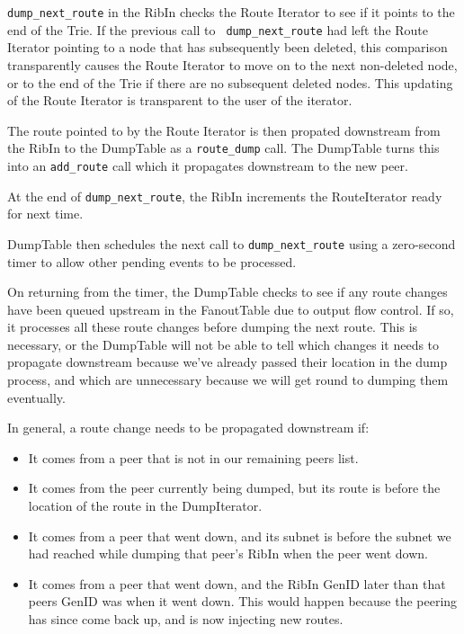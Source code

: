\documentclass[11pt]{article}
\begin{document}
{\tt dump\_next\_route} in the RibIn checks the Route Iterator to see
if it points to the end of the Trie.  If the previous call to {\tt
dump\_next\_route} had left the Route Iterator pointing to a node that has
subsequently been deleted, this comparison transparently causes the
Route Iterator to move on to the next non-deleted node, or to the end
of the Trie if there are no subsequent deleted nodes.  This updating
of the Route Iterator is transparent to the user of the iterator.

The route pointed to by the Route Iterator is then propated downstream
from the RibIn to the DumpTable as a {\tt route\_dump} call.  The
DumpTable turns this into an {\tt add\_route} call which it propagates
downstream to the new peer.

At the end of {\tt dump\_next\_route}, the RibIn increments the
RouteIterator ready for next time.  

DumpTable then schedules the next call to {\tt dump\_next\_route} using a
zero-second timer to allow other pending events to be processed.

On returning from the timer, the DumpTable checks to see if any route
changes have been queued upstream in the FanoutTable due to output
flow control.  If so, it processes all these route changes before
dumping the next route.  This is necessary, or the DumpTable will not
be able to tell which changes it needs to propagate downstream because
we've already passed their location in the dump process, and which are
unnecessary because we will get round to dumping them eventually.

In general, a route
change needs to be propagated downstream if:

\begin{itemize}

  \item It comes from a peer that is not in our remaining peers list.

  \item It comes from the peer currently being dumped, but its route is
  before the location of the route in the DumpIterator.

  \item It comes from a peer that went down, and its subnet is before the
  subnet we had reached while dumping that peer's RibIn when the peer
  went down.

  \item It comes from a peer that went down, and the RibIn GenID later
  than that peers GenID was when it went down.  This would happen
  because the peering has since come back up, and is now injecting new
  routes.

\end{itemize}
\end{document}
